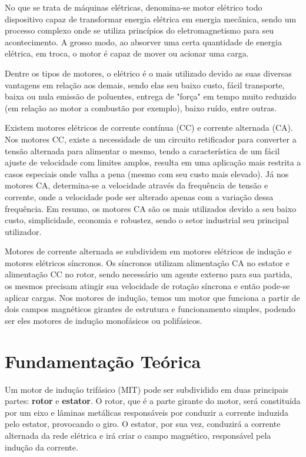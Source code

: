 \documentclass[a4paper,12pt,oneside]{article}
\begin{document}
No que se trata de máquinas elétricas, denomina-se motor elétrico todo dispositivo capaz de transformar energia elétrica em energia mecânica, sendo um processo complexo onde se utiliza princípios do eletromagnetismo para seu acontecimento. A grosso modo, ao absorver uma certa quantidade de energia elétrica, em troca, o motor é capaz de mover ou acionar uma carga.

Dentre os tipos de motores, o elétrico é o mais utilizado devido as suas diversas vantagens em relação aos demais, sendo elas seu baixo custo, fácil transporte, baixa ou nula emissão de poluentes, entrega de "força" em tempo muito reduzido (em relação ao motor a combustão por exemplo), baixo ruído, entre outras.

Existem motores elétricos de corrente contínua (CC) e corrente alternada (CA). Nos motores CC, existe a necessidade de um circuito retificador para converter a tensão alternada para alimentar o mesmo, tendo a característica de um fácil ajuste de velocidade com limites amplos, resulta em uma aplicação mais restrita a casos especiais onde valha a pena (mesmo com seu custo mais elevado). Já nos motores CA, determina-se a velocidade através da frequência de tensão e corrente, onde a velocidade pode ser alterado apenas com a variação dessa frequência. Em resumo, os motores CA são os mais utilizados devido a seu baixo custo, simplicidade, economia e robustez, sendo o setor industrial seu principal utilizador. 

Motores de corrente alternada se subdividem em motores elétricos de indução e motores elétricos síncronos. Os síncronos utilizam alimentação CA no estator e alimentação CC no rotor, sendo necessário um agente externo para sua partida, os mesmos precisam atingir sua velocidade de rotação síncrona e então pode-se aplicar cargas. Nos motores de indução, temos um motor que funciona a partir de dois campos magnéticos girantes de estrutura e funcionamento simples, podendo ser eles motores de indução monofásicos ou polifásicos.

\newpage
\section{Fundamentação Teórica}\hspace{0pt}

Um motor de indução trifásico (MIT) pode ser subdividido em duas principais partes: \textbf{rotor} e \textbf{estator}. O rotor, que é a parte girante do motor, será constituída por um eixo e lâminas metálicas responsáveis por conduzir a corrente induzida pelo estator, provocando o giro. O estator, por sua vez, conduzirá a corrente alternada da rede elétrica e irá criar o campo magnético, responsável pela indução da corrente.
\end{document}
